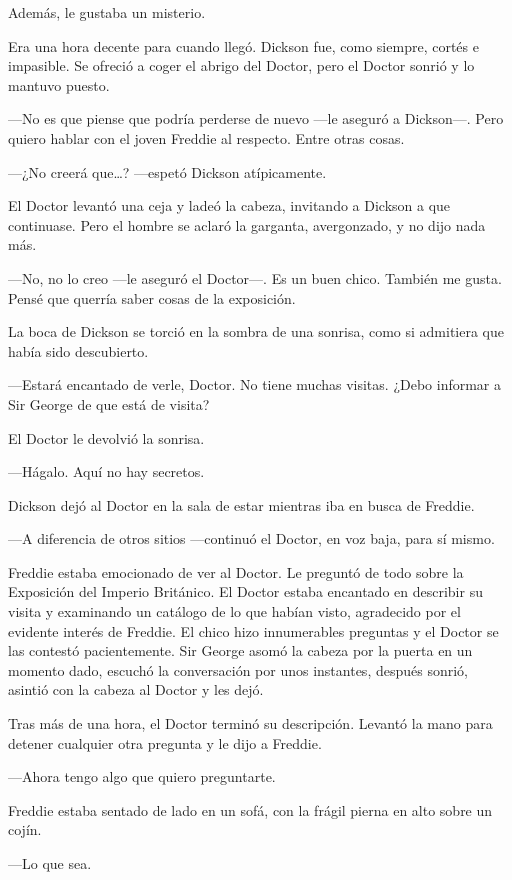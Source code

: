 {Además, le gustaba un misterio.}

{Era una hora decente para cuando llegó. Dickson fue, como siempre,
	cortés e impasible. Se ofreció a coger el abrigo del Doctor, pero el
Doctor sonrió y lo mantuvo puesto.}

{---No es que piense que podría perderse de nuevo ---le aseguró a
	Dickson---. Pero quiero hablar con el joven Freddie al respecto. Entre
otras cosas.}

{---¿No creerá que\ldots{}? ---espetó Dickson atípicamente.}

{El Doctor levantó una ceja y ladeó la cabeza, invitando a Dickson a que
	continuase. Pero el hombre se aclaró la garganta, avergonzado, y no dijo
nada más.}

{---No, no lo creo ---le aseguró el Doctor---. Es un buen chico. También
me gusta. Pensé que querría saber cosas de la exposición.}

{La boca de Dickson se torció en la sombra de una sonrisa, como si
admitiera que había sido descubierto.}

{---Estará encantado de verle, Doctor. No tiene muchas visitas. ¿Debo
informar a Sir George de que está de visita?}

{El Doctor le devolvió la sonrisa.}

{---Hágalo. Aquí no hay secretos.}

{Dickson dejó al Doctor en la sala de estar mientras iba en busca de
Freddie.}

{---A diferencia de otros sitios ---continuó el Doctor, en voz baja,
para sí mismo.}

{Freddie estaba emocionado de ver al Doctor. Le preguntó de todo sobre
	la Exposición del Imperio Británico. El Doctor estaba encantado en
	describir su visita y examinando un catálogo de lo que habían visto,
	agradecido por el evidente interés de Freddie. El chico hizo
	innumerables preguntas y el Doctor se las contestó pacientemente. Sir
	George asomó la cabeza por la puerta en un momento dado, escuchó la
	conversación por unos instantes, después sonrió, asintió con la cabeza
al Doctor y les dejó.}

{Tras más de una hora, el Doctor terminó su descripción. Levantó la mano
para detener cualquier otra pregunta y le dijo a Freddie.}

{---Ahora tengo algo que quiero preguntarte.}

{Freddie estaba sentado de lado en un sofá, con la frágil pierna en alto
sobre un cojín.}

{---Lo que sea.}

